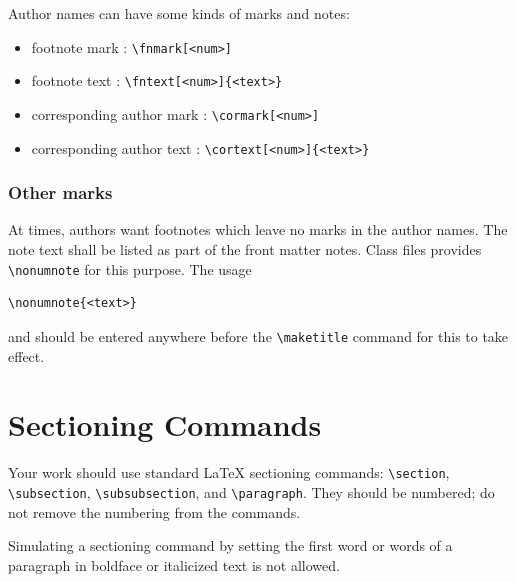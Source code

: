 \documentclass[
]{ceurart}
\begin{document}
Author names can have some kinds of marks and notes:
\begin{itemize}
\item footnote mark : \verb|\fnmark[<num>]|
\item footnote text : \verb|\fntext[<num>]{<text>}|
\item corresponding author mark : \verb|\cormark[<num>]|
\item corresponding author text : \verb|\cortext[<num>]{<text>}|
\end{itemize}

\subsubsection{Other marks}

At times, authors want footnotes which leave no marks in the author names. The note text shall be listed as part of the front matter notes. Class files provides \verb|\nonumnote| for this purpose. The usage
\begin{lstlisting}[language={[latex]TeX}]
\nonumnote{<text>}
\end{lstlisting}
and should be entered anywhere before the \verb|\maketitle| command for this to take effect.

\section{Sectioning Commands}

Your work should use standard \LaTeX{} sectioning commands:
\verb|\section|, \verb|\subsection|,
\verb|\subsubsection|, and
\verb|\paragraph|. They should be numbered; do not remove the numbering from the commands.

Simulating a sectioning command by setting the first word or words of a paragraph in boldface or italicized text is not allowed.
\end{document}

